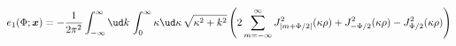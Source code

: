 \begin{equation}
\label{57}
e_1(\Phi;\boldsymbol{x})=-\frac{1}{2\pi^2}\int_{-\infty}^\infty
\ud k\,\int_0^\infty\kappa
\ud\kappa\,\sqrt{\kappa^2+k^2}\left(2\sum\limits_{m=-\infty}^\infty
J^2_{|m+\Phi/2|}(\kappa\rho)+J^2_{-\Phi/2}(\kappa\rho)
-J^2_{\Phi/2}(\kappa\rho)\right)
\end{equation}


